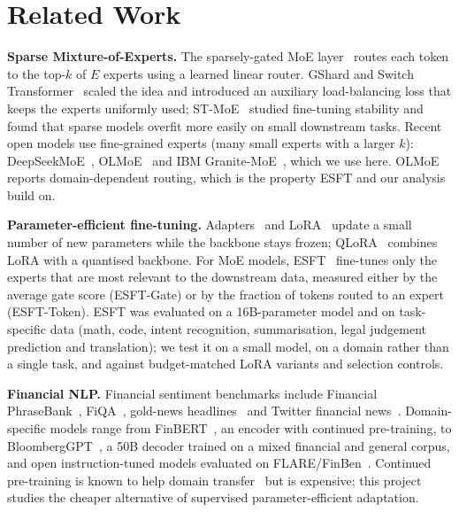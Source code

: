 \section{Related Work}

\textbf{Sparse Mixture-of-Experts.} The sparsely-gated MoE layer~\cite{shazeer2017moe} routes
each token to the top-$k$ of $E$ experts using a learned linear router. GShard and Switch
Transformer~\cite{lepikhin2021gshard,fedus2022switch} scaled the idea and introduced an
auxiliary load-balancing loss that keeps the experts uniformly used; ST-MoE~\cite{zoph2022stmoe}
studied fine-tuning stability and found that sparse models overfit more easily on small
downstream tasks. Recent open models use fine-grained experts (many small experts with a larger
$k$): DeepSeekMoE~\cite{dai2024deepseekmoe}, OLMoE~\cite{muennighoff2024olmoe} and IBM
Granite-MoE~\cite{granite2024}, which we use here. OLMoE reports domain-dependent routing,
which is the property ESFT and our analysis build on.

\textbf{Parameter-efficient fine-tuning.} Adapters~\cite{houlsby2019adapters} and
LoRA~\cite{hu2022lora} update a small number of new parameters while the backbone stays frozen;
QLoRA~\cite{dettmers2023qlora} combines LoRA with a quantised backbone. For MoE models,
ESFT~\cite{wang2024esft} fine-tunes only the experts that are most relevant to the downstream
data, measured either by the average gate score (ESFT-Gate) or by the fraction of tokens routed
to an expert (ESFT-Token). ESFT was evaluated on a 16B-parameter model and on task-specific
data (math, code, intent recognition, summarisation, legal judgement prediction and translation); we test it on a small model, on a domain rather than a
single task, and against budget-matched LoRA variants and selection controls.

\textbf{Financial NLP.} Financial sentiment benchmarks include Financial PhraseBank~\cite{malo2014fpb},
FiQA~\cite{maia2018fiqa}, gold-news headlines~\cite{sinha2021headlines} and Twitter financial
news~\cite{tfns2022}. Domain-specific models range from FinBERT~\cite{araci2019finbert}, an
encoder with continued pre-training, to BloombergGPT~\cite{wu2023bloomberggpt}, a 50B
decoder trained on a mixed financial and general corpus, and open instruction-tuned models
evaluated on FLARE/FinBen~\cite{xie2023pixiu,xie2024finben,yang2023fingpt}. Continued
pre-training is known to help domain transfer~\cite{gururangan2020dont} but is expensive; this
project studies the cheaper alternative of supervised parameter-efficient adaptation.
